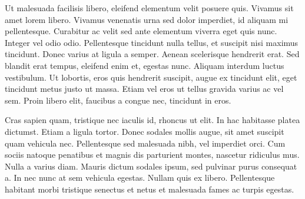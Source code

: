 \documentclass[10pt]{llncs}
\begin{document}
Ut malesuada facilisis libero, eleifend elementum velit posuere quis. Vivamus sit amet lorem libero. Vivamus venenatis urna sed dolor imperdiet, id aliquam mi pellentesque. Curabitur ac velit sed ante elementum viverra eget quis nunc. Integer vel odio odio. Pellentesque tincidunt nulla tellus, et suscipit nisi maximus tincidunt. Donec varius at ligula a semper. Aenean scelerisque hendrerit erat. Sed blandit erat tempus, eleifend enim et, egestas nunc. Aliquam interdum luctus vestibulum. Ut lobortis, eros quis hendrerit suscipit, augue ex tincidunt elit, eget tincidunt metus justo ut massa. Etiam vel eros ut tellus gravida varius ac vel sem. Proin libero elit, faucibus a congue nec, tincidunt in eros.

Cras sapien quam, tristique nec iaculis id, rhoncus ut elit. In hac habitasse platea dictumst. Etiam a ligula tortor. Donec sodales mollis augue, sit amet suscipit quam vehicula nec. Pellentesque sed malesuada nibh, vel imperdiet orci. Cum sociis natoque penatibus et magnis dis parturient montes, nascetur ridiculus mus. Nulla a varius diam. Mauris dictum sodales ipsum, sed pulvinar purus consequat a. In nec nunc at sem vehicula egestas. Nullam quis ex libero. Pellentesque habitant morbi tristique senectus et netus et malesuada fames ac turpis egestas.



\end{document}
